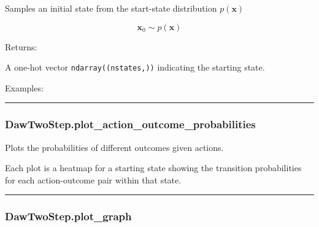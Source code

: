 Samples an initial state from the start-state distribution
\(p(\mathbf x)\)

\[
\mathbf x_0 \sim p(\mathbf x)
\]

Returns:

A one-hot vector \texttt{ndarray((nstates,))} indicating the starting
state.

Examples:

\begin{Shaded}
\begin{Highlighting}[]
\OperatorTok{=}
\end{Highlighting}
\end{Shaded}

\begin{center}\rule{0.5\linewidth}{\linethickness}\end{center}

\subsubsection{DawTwoStep.plot\_action\_outcome\_probabilities}\label{dawtwostep.plot_action_outcome_probabilities}

\begin{Shaded}
\begin{Highlighting}[]
\OperatorTok{=}\OperatorTok{=}\OperatorTok{=}\OperatorTok{=}\NormalTok{)}
\end{Highlighting}
\end{Shaded}

Plots the probabilities of different outcomes given actions.

Each plot is a heatmap for a starting state showing the transition
probabilities for each action-outcome pair within that state.

\begin{center}\rule{0.5\linewidth}{\linethickness}\end{center}

\subsubsection{DawTwoStep.plot\_graph}\label{dawtwostep.plot_graph}

\begin{Shaded}
\begin{Highlighting}[]
\OperatorTok{=}\OperatorTok{=}\OperatorTok{=}\OperatorTok{=}\OperatorTok{=}\OperatorTok{=}\OperatorTok{=}\OperatorTok{=}\NormalTok{)}
\end{Highlighting}
\end{Shaded}

